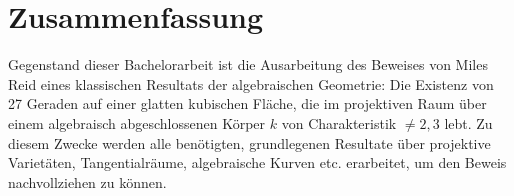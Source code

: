 \documentclass[12pt,a4paper,twoside]{article}
\begin{document}
\pagestyle{empty}


\section*{Zusammenfassung}

Gegenstand dieser Bachelorarbeit ist die Ausarbeitung des Beweises von Miles Reid eines klassischen Resultats der algebraischen Geometrie: Die Existenz von 27 Geraden auf einer glatten kubischen Fläche, die im projektiven Raum über einem algebraisch abgeschlossenen Körper $k$ von Charakteristik $\neq 2,3$ lebt.
Zu diesem Zwecke werden alle benötigten, grundlegenen Resultate über projektive Varietäten, Tangentialräume, algebraische Kurven etc. erarbeitet, um den Beweis nachvollziehen zu können.

\newpage
\tableofcontents

\newpage

\pagestyle{headings}


















\end{document}
